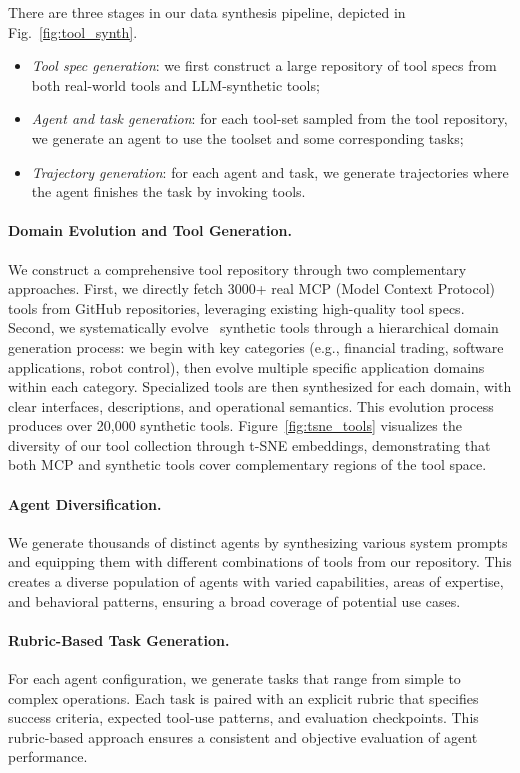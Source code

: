 There are three stages in our data synthesis pipeline, depicted in Fig.~\ref{fig:tool_synth}.
\begin{itemize}
    \item \textit{Tool spec generation}: we first construct a large repository of tool specs from both real-world tools
    and LLM-synthetic tools;
    \item \textit{Agent and task generation}: for each tool-set sampled from the tool repository, we generate an agent to use the toolset and some corresponding tasks;
    \item \textit{Trajectory generation}: for each agent and task, we generate trajectories where the agent finishes the task by invoking tools.
\end{itemize}


\paragraph{Domain Evolution and Tool Generation.} We construct a comprehensive tool repository through two complementary approaches. First, we directly fetch 3000+ real MCP (Model Context Protocol) tools from GitHub repositories, leveraging existing high-quality tool specs. Second, we systematically evolve~\citep{xu2025wizardlmempoweringlargepretrained} synthetic tools through a hierarchical domain generation process: we begin with key categories (e.g., financial trading, software applications, robot control), then evolve multiple specific application domains within each category. Specialized tools are then synthesized for each domain, with clear interfaces, descriptions, and operational semantics. This evolution process produces over 20,000 synthetic tools. Figure~\ref{fig:tsne_tools} visualizes the diversity of our tool collection through t-SNE embeddings, demonstrating that both MCP and synthetic tools cover complementary regions of the tool space.

\paragraph{Agent Diversification.} We generate thousands of distinct agents by synthesizing various system prompts and equipping them with different combinations of tools from our repository. This creates a diverse population of agents with varied capabilities, areas of expertise, and behavioral patterns, ensuring a broad coverage of potential use cases.

\paragraph{Rubric-Based Task Generation.} For each agent configuration, we generate tasks that range from simple to complex operations. Each task is paired with an explicit rubric that specifies success criteria, expected tool-use patterns, and evaluation checkpoints. This rubric-based approach ensures a consistent and objective evaluation of agent performance.


